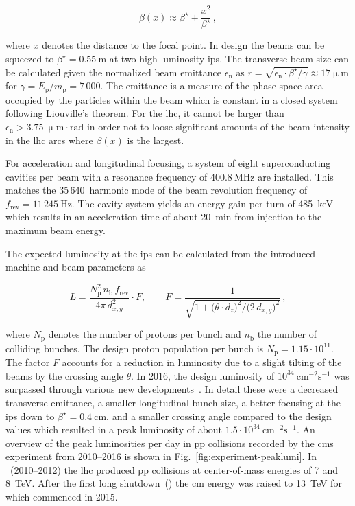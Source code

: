\begin{equation}
\beta(x)\approx\beta^\star+\frac{x^2}{\beta^\star}\,,
\end{equation}

where $x$ denotes the distance to the focal point. In design the beams can be squeezed to $\beta^\star=0.55~\mathrm{m}$ at two high luminosity \glspl{ip}. The transverse beam size can be calculated given the normalized beam emittance $\epsilon_\mathrm{n}$ as $r=\sqrt{\epsilon_\mathrm{n}\cdot\beta^\star/\gamma}\approx17\upmu\mathrm{m}$ for $\gamma=E_\mathrm{p}/m_\mathrm{p}=7\,000$. The emittance is a measure of the phase space area occupied by the particles within the beam which is constant in a closed system following Liouville's theorem. For the \gls{lhc}, it cannot be larger than $\epsilon_\mathrm{n}>3.75~\upmu\mathrm{m}\cdot\mathrm{rad}$ in order not to loose significant amounts of the beam intensity in the \gls{lhc} arcs where $\beta(x)$ is the largest.

For acceleration and longitudinal focusing, a system of eight superconducting cavities per beam with a resonance frequency of $400.8~\mathrm{MHz}$ are installed. This matches the 35\,640~harmonic mode of the beam revolution frequency of $f_\mathrm{rev}=11\,245~\mathrm{Hz}$. The cavity system yields an energy gain per turn of 485~keV which results in an acceleration time of about 20~min from injection to the maximum beam energy.

The expected luminosity at the \glspl{ip} can be calculated from the introduced machine and beam parameters as

\begin{equation}
L=\frac{N_\mathrm{p}^{2}\,n_\mathrm{b}\,f_\mathrm{rev}}{4\pi\,d^2_{x,y}}\cdot F,\qquad F=\frac{1}{\sqrt{1+\big(\theta\cdot d_{z}\big)^2\big/\big({2\,d_{x,y}}\big)^2}}\,,
\end{equation}

where $N_\mathrm{p}$ denotes the number of protons per bunch and $n_\mathrm{b}$ the number of colliding bunches. The design proton population per bunch is $N_\mathrm{p}=1.15\cdot10^{11}$. The factor $F$ accounts for a reduction in luminosity due to a slight tilting of the beams by the crossing angle $\theta$. In 2016, the design luminosity of $10^{34}~\mathrm{cm}^{-2}\mathrm{s}^{-1}$ was surpassed through various new developments~\cite{Team:2229040}. In detail these were a decreased transverse emittance, a smaller longitudinal bunch size, a better focusing at the \glspl{ip} down to $\beta^\star=0.4~\mathrm{cm}$, and a smaller crossing angle compared to the design values which resulted in a peak luminosity of about $1.5\cdot 10^{34}~\mathrm{cm}^{-2}\mathrm{s}^{-1}$. An overview of the peak luminosities per day in \gls{pp} collisions recorded by the \gls{cms} experiment from 2010--2016 is shown in Fig.~\ref{fig:experiment-peaklumi}. In ~(2010--2012) the \gls{lhc} produced \gls{pp} collisions at center-of-mass energies of 7 and 8~TeV. After the first long shutdown~() the \acrlong{cm} energy was raised to 13~TeV for  which commenced in 2015.


